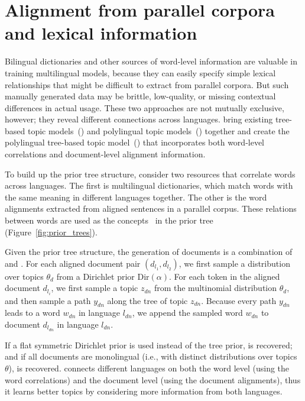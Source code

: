 \section{Alignment from parallel corpora and lexical information}

Bilingual dictionaries and other sources of word-level information are valuable in training multilingual models, because they can easily specify simple lexical relationships that might be difficult to extract from parallel corpora.
But such manually generated data may be brittle, low-quality, or missing contextual differences in actual usage.
These two approaches are not mutually exclusive, however; they reveal
different connections across languages. \citet{hu-14} bring existing
tree-based topic models~(\tlda{}) and polylingual topic
models~(\plda{}) together and create the polylingual tree-based topic
model~(\ptlda{}) that incorporates both word-level correlations and
document-level alignment information.

To build up the prior tree structure, \citet{hu-14} consider two
resources that correlate words across languages. The first is
multilingual dictionaries, which match words with the same meaning in
different languages together. The other is the word alignments
extracted from aligned sentences in a parallel corpus. These relations
between words are used as the concepts~\citep{Bhattacharya-2006} in
the prior tree (Figure~\ref{fig:prior_trees}).

Given the prior tree structure, the generation of documents is a
combination of \tlda{} and \plda{}.  For each aligned document pair
$(d_{l_1}, d_{l_2})$, we first sample a distribution over topics
$\theta_d$ from a Dirichlet prior $\text{Dir}(\alpha)$.  For each
token in the aligned document $d_{l_i}$, we first sample a topic
$z_{dn}$ from the multinomial distribution $\theta_d$, and then sample
a path $y_{dn}$ along the tree of topic $z_{dn}$. Because every path
$y_{dn}$ leads to a word $w_{dn}$ in language $l_{dn}$, we append the
sampled word $w_{dn}$ to document $d_{l_{dn}}$ in language $l_{dn}$.

If a flat symmetric Dirichlet prior is used instead of the tree prior,
\plda{} is recovered; and if all documents are monolingual (i.e., with
distinct distributions over topics $\theta$), \tlda{} is
recovered. \ptlda{} connects different languages on both the word
level (using the word correlations) and the document level (using the
document alignments), thus it learns better topics by considering more
information from both languages.


